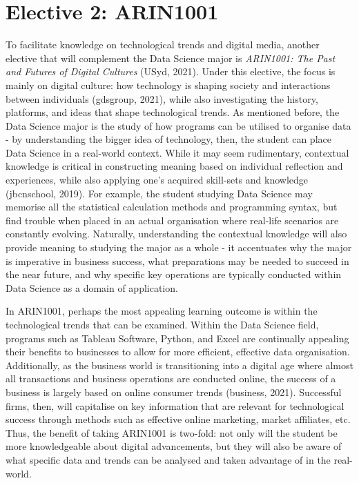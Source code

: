 \documentclass[11pt, a4paper]{report}
\begin{document}
\section{\textbf{Elective 2: ARIN1001}}


To facilitate knowledge on technological trends and digital media, another elective that will complement the Data Science major is \textit{ARIN1001: The Past and Futures of Digital Cultures} (USyd, 2021). Under this elective, the focus is mainly on digital culture: how technology is shaping society and interactions between individuals (gdsgroup, 2021), while also investigating the history, platforms, and ideas that shape technological trends. As mentioned before, the Data Science major is the study of how programs can be utilised to organise data - by understanding the bigger idea of technology, then, the student can place Data Science in a real-world context. While it may seem rudimentary, contextual knowledge is critical in constructing meaning based on individual reflection and experiences, while also applying one’s acquired skill-sets and knowledge (jbcnschool, 2019). For example, the student studying Data Science may memorise all the statistical calculation methods and programming syntax, but find trouble when placed in an actual organisation where real-life scenarios are constantly evolving. Naturally, understanding the contextual knowledge will also provide meaning to studying the major as a whole - it accentuates why the major is imperative in business success, what preparations may be needed to succeed in the near future, and why specific key operations are typically conducted within Data Science as a domain of application.


In ARIN1001, perhaps the most appealing learning outcome is within the technological trends that can be examined. Within the Data Science field, programs such as Tableau Software, Python, and Excel are continually appealing their benefits to businesses to allow for more efficient, effective data organisation. Additionally, as the business world is transitioning into a digital age where almost all transactions and business operations are conducted online, the success of a business is largely based on online consumer trends (business, 2021). Successful firms, then, will capitalise on key information that are relevant for technological success through methods such as effective online marketing, market affiliates, etc. Thus, the benefit of taking ARIN1001 is two-fold: not only will the student be more knowledgeable about digital advancements, but they will also be aware of what specific data and trends can be analysed and taken advantage of in the real-world. 
\end{document}
